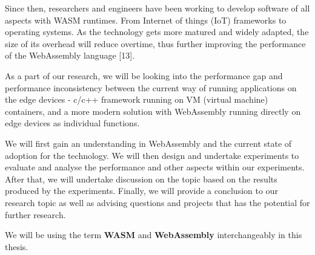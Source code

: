Since then, researchers and engineers have been working to develop software of all aspects with WASM runtimes. From Internet of things (IoT) frameworks to operating systems. As the technology gets more matured and widely adapted, the size of its overhead will reduce overtime, thus further improving the performance of the WebAssembly language [13].

As a part of our research, we will be looking into the performance gap and performance inconsistency between the current way of running applications on the edge devices - c/c++ framework running on VM (virtual machine) containers, and a more modern solution with WebAssembly running directly on edge devices as individual functions.

We will first gain an understanding in WebAssembly and the current state of adoption for the technology. We will then design and undertake experiments to evaluate and analyse the performance and other aspects within our experiments. After that, we will undertake discussion on the topic based on the results produced by the experiments. Finally, we will provide a conclusion to our research topic as well as advising questions and projects that has the potential for further research.

\bigskip

We will be using the term \textbf{WASM} and \textbf{WebAssembly} interchangeably in this thesis.